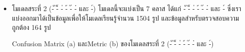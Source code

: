\documentclass[12pt,oneside,openright,a4paper]{cpe-thai-project}
\begin{document}
\begin{itemize}
\begin{table}[!ht]
\begin{subtable}{.5\linewidth}
\begin{tabular}{ll|P{1cm}|P{1cm}|P{1cm}|P{1cm}|}
        \end{tabular}
      \end{subtable}
      \end{table}
        \item โมเดลสระที่ 2 (-ั -็ -่ -้ -๊ -๋ และ -์)
        โมเดลนี้จะแบ่งเป็น 7 คลาส ได้แก่ -ั -็ -่ -้ -๊ -๋ และ -์ ซึ่งเราแบ่งออกมาได้เป็นข้อมูลเพื่อให้โมเดลเรียนรู้จำนวน 1504 รูป และข้อมูลสำหรับตรวจสอบความถูกต้อง 164 รูป
        \begin{table}[!ht]
          \caption{Confusion Matrix (a) และMetric (b) ของโมเดลสระที่ 2 (-ั -็ -่ -้ -๊ -๋ และ -์)}
          \begin{subtable}{.5\linewidth}  
          \centering
          \caption{}
          \begin{tabular}{ll|P{0.4cm}|P{0.4cm}|P{0.4cm}|P{0.4cm}|P{0.4cm}|P{0.4cm}|P{0.4cm}|}
              

\end{tabular}
\end{subtable}
\end{table}
\end{itemize}
\end{document}
